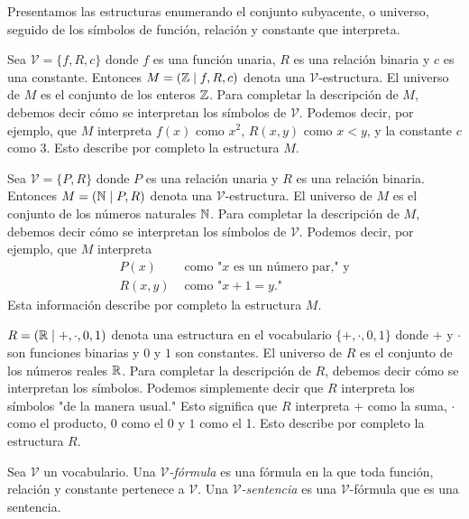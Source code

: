 \message{ !name(main.tex)}\documentclass[12pt,a4paper]{book}
\newcommand{\comillas}[1]{"#1"}
\newcommand{\VV}{\mathcal{V}}
\begin{document}
    Presentamos las estructuras enumerando el conjunto subyacente, o universo, seguido de los símbolos de función, relación
    y constante que interpreta.

    \begin{ejemplo}\label{ej:estructura-Z}
        Sea $\VV=\{f,R,c\}$ donde $f$ es una función unaria, $R$ es una relación binaria y $c$ es una constante. Entonces
        $M=(\mathbb{Z}\mid f,R,c)$ denota una $\VV$-estructura. El universo de $M$ es el conjunto de los enteros $\mathbb{Z}$. Para
        completar la descripción de $M$, debemos decir cómo se interpretan los símbolos de $\VV$. Podemos decir, por
        ejemplo, que $M$ interpreta $f(x)$ como $x^{2}$, $R(x,y)$ como $x<y$, y la constante $c$ como 3. Esto describe por
        completo la estructura $M$.
    \end{ejemplo}

    \begin{ejemplo}\label{ej:estructura-N}
        Sea $\VV=\{P,R\}$ donde $P$ es una relación unaria y $R$ es una relación binaria. Entonces $M=(\mathbb{N}\mid P,R)$ denota
        una $\VV$-estructura. El universo de $M$ es el conjunto de los números naturales $\mathbb{N}$. Para completar la
        descripción de $M$, debemos decir cómo se interpretan los símbolos de $\VV$. Podemos decir, por ejemplo, que $M$
        interpreta
        \begin{align*}
            P(x)&\text{ como \comillas{$x$ es un número par,} y}\\
            R(x,y)&\text{ como \comillas{$x+1=y$.}}
        \end{align*}
        Esta información describe por completo la estructura $M$.
    \end{ejemplo}

    \begin{ejemplo}\label{ej:estructura-R-aritmetica}
        $R=(\mathbb{R}\mid+,\cdot,0,1)$ denota una estructura en el vocabulario $\{+,\cdot,0,1\}$ donde $+$ y $\cdot$ son funciones
        binarias y $0$ y $1$ son constantes. El universo de $R$ es el conjunto de los números reales $\mathbb{R}$. Para completar la
        descripción de $R$, debemos decir cómo se interpretan los símbolos. Podemos simplemente decir que $R$ interpreta los
        símbolos \comillas{de la manera usual.} Esto significa que $R$ interpreta $+$ como la suma, $\cdot$ como el
        producto, $0$ como el 0 y $1$ como el 1. Esto describe por completo la estructura $R$.
    \end{ejemplo}

    \begin{definicion}\label{def:v-formula-sentencia}
        Sea $\VV$ un vocabulario. Una \textit{$\VV$-fórmula} es una fórmula en la que toda función, relación y constante
        pertenece a $\VV$. Una \textit{$\VV$-sentencia} es una $\VV$-fórmula que es una sentencia.
    \end{definicion}
\end{document}
